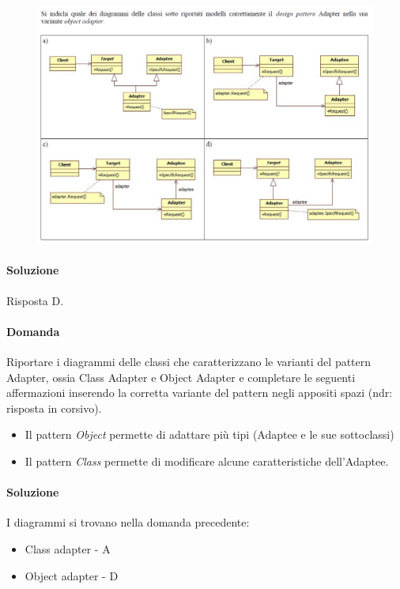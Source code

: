 \begin{figure}[H]\center
\includegraphics[width=1\textwidth]{res/img/Esercizi/es-adapter}
\end{figure}

\paragraph{Soluzione} Risposta D.

\paragraph{Domanda}

Riportare i diagrammi delle classi che caratterizzano le varianti del pattern Adapter, ossia Class Adapter e Object Adapter
e completare le seguenti affermazioni inserendo la corretta variante del pattern negli appositi spazi (ndr: risposta in corsivo).
\begin{itemize}
\item Il pattern \textit{Object} permette di adattare più tipi (Adaptee e le sue sottoclassi)
\item Il pattern \textit{Class} permette di modificare alcune caratteristiche dell’Adaptee.
\end{itemize}

\paragraph{Soluzione}
I diagrammi si trovano nella domanda precedente:
\begin{itemize}
\item Class adapter - A
\item Object adapter - D
\end{itemize}



